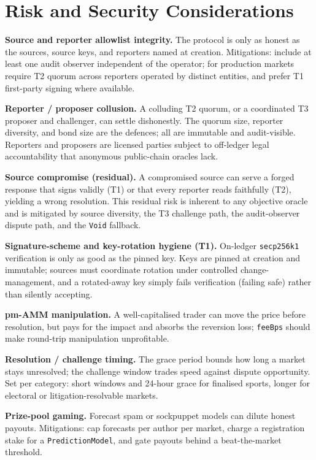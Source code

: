 \documentclass[11pt,a4paper]{article}
\begin{document}
\section{Risk and Security Considerations}

\textbf{Source and reporter allowlist integrity.} The protocol is only as honest as the sources, source keys, and reporters named at creation. Mitigations: include at least one audit observer independent of the operator; for production markets require T2 quorum across reporters operated by distinct entities, and prefer T1 first-party signing where available.

\textbf{Reporter / proposer collusion.} A colluding T2 quorum, or a coordinated T3 proposer and challenger, can settle dishonestly. The quorum size, reporter diversity, and bond size are the defences; all are immutable and audit-visible. Reporters and proposers are licensed parties subject to off-ledger legal accountability that anonymous public-chain oracles lack.

\textbf{Source compromise (residual).} A compromised source can serve a forged response that signs validly (T1) or that every reporter reads faithfully (T2), yielding a wrong resolution. This residual risk is inherent to any objective oracle and is mitigated by source diversity, the T3 challenge path, the audit-observer dispute path, and the \texttt{Void} fallback.

\textbf{Signature-scheme and key-rotation hygiene (T1).} On-ledger \texttt{secp256k1} verification is only as good as the pinned key. Keys are pinned at creation and immutable; sources must coordinate rotation under controlled change-management, and a rotated-away key simply fails verification (failing safe) rather than silently accepting.

\textbf{pm-AMM manipulation.} A well-capitalised trader can move the price before resolution, but pays for the impact and absorbs the reversion loss; \texttt{feeBps} should make round-trip manipulation unprofitable.

\textbf{Resolution / challenge timing.} The grace period bounds how long a market stays unresolved; the challenge window trades speed against dispute opportunity. Set per category: short windows and 24-hour grace for finalised sports, longer for electoral or litigation-resolvable markets.

\textbf{Prize-pool gaming.} Forecast spam or sockpuppet models can dilute honest payouts. Mitigations: cap forecasts per author per market, charge a registration stake for a \texttt{PredictionModel}, and gate payouts behind a beat-the-market threshold.
\end{document}
